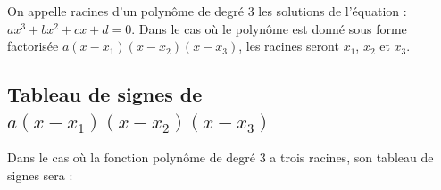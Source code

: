 \documentclass[a4paper,12pt]{article}
\begin{document}
On appelle racines d’un polynôme de degré 3 les solutions de l’équation : $ax^3 + bx^2 + cx + d = 0$. Dans le cas où le polynôme est donné sous forme factorisée $a(x - x_1)(x - x_2)(x - x_3)$, les racines seront $x_1$, $x_2$ et $x_3$.

\subsection*{Tableau de signes de $a(x - x_1)(x - x_2)(x - x_3)$}

Dans le cas où la fonction polynôme de degré 3 a trois racines, son tableau de signes sera :
\end{document}

